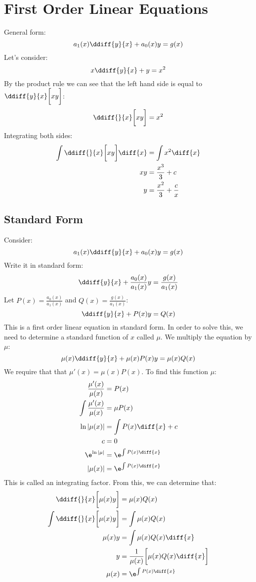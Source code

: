 \documentclass{math}
\begin{document}
\section*{First Order Linear Equations}
General form:
\[ a_1(x)\ddiff{y}{x}+a_0(x)y = g(x) \]
Let's consider:
\[ x\ddiff{y}{x}+y = x^2 \]
By the product rule we can see that the left hand side is equal to
\( \ddiff{y}{x}\bigg[xy\bigg] \):
\[ \ddiff{}{x}\bigg[xy\bigg] = x^2 \]
Integrating both sides:
\begin{align*}
  \int\ddiff{}{x}\bigg[xy\bigg]\diff{x} &= \int x^2\diff{x} \\
  xy &= \frac{x^3}{3}+c \\
  y &= \frac{x^2}{3}+\frac{c}{x}
\end{align*}

\subsection*{Standard Form}
Consider:
\[ a_1(x)\ddiff{y}{x}+a_0(x)y = g(x) \]
Write it in standard form:
\[ \ddiff{y}{x}+\frac{a_0(x)}{a_1(x)}y = \frac{g(x)}{a_1(x)} \]
Let \( P(x) = \frac{a_0(x)}{a_1(x)} \) and \( Q(x) = \frac{g(x)}{a_1(x)} \):
\[ \ddiff{y}{x}+P(x)y = Q(x) \]
This is a first order linear equation in standard form. In order to solve this,
we need to determine a standard function of \( x \) called \( \mu \). We
multiply the equation by \( \mu \):
\[ \mu(x)\ddiff{y}{x}+\mu(x)P(x)y = \mu(x)Q(x) \]
We require that that \( \mu'(x) = \mu(x)P(x) \). To find this function
\( \mu \):
\begin{align*}
  \frac{\mu'(x)}{\mu(x)} &= P(x) \\
  \int \frac{\mu'(x)}{\mu(x)} &= \mu P(x) \\
  \ln|\mu(x)| &= \int P(x)\diff{x}+c \\
  c &= 0 \\
  \e^{\ln|\mu|} &= \e^{\int P(x)\diff{x}} \\
  |\mu(x)| &= \e^{\int P(x)\diff{x}}
\end{align*}
This is called an integrating factor. From this, we can determine that:
\begin{align*}
  \ddiff{}{x}\bigg[\mu(x)y\bigg] &= \mu(x)Q(x) \\
  \int\ddiff{}{x}\bigg[\mu(x)y\bigg] &= \int\mu(x)Q(x) \\
  \mu(x)y &= \int\mu(x)Q(x)\diff{x} \\
  y &= \frac{1}{\mu(x)}\bigg[\mu(x)Q(x)\diff{x}\bigg] \\
  \mu(x) &= \e^{\int P(x)\diff{x}}
\end{align*}
\end{document}
